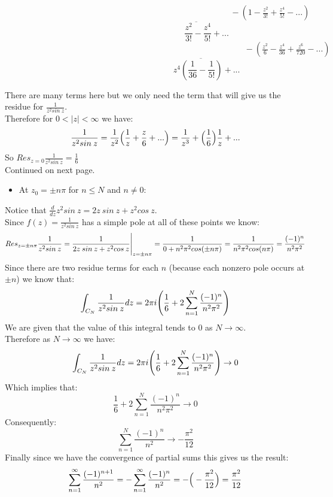 \documentclass{article}
\begin{document}
$\;\;\;\;\;\;\;\;\;\;\;\;\;\;\;\;\;\;\;\;\;\;\;\;\;\;\;\;\;\;\;\;\;\;\;\;\;\;\;\;\;\;\;\;\;\;\;\;\;\;\;\;\;\;\;\;\;\;\;\;\;\;\;\;\;\;\;\;\;\;\;\;\;\;\;\;\;\;\;\;\;\;\;\;\;\;\;\;\;\;\;\;\;\;\;\;\; -(1 -\frac{z^2}{3!} +\frac{z^4}{5!} -...)$
\[\;\;\;\;\;\;\;\;\;\;\;\;\;\;\;\;\;\;\;\;\;\;\;\;\;\;\;\;\;\;\;\;\;\;\;\overline{\;\;\;\;\;\;\;\;\;\frac{z^2}{3!} -\frac{z^4}{5!} + ...}\]
$\;\;\;\;\;\;\;\;\;\;\;\;\;\;\;\;\;\;\;\;\;\;\;\;\;\;\;\;\;\;\;\;\;\;\;\;\;\;\;\;\;\;\;\;\;\;\;\;\;\;\;\;\;\;\;\;\;\;\;\;\;\;\;\;\;\;\;\;\;\;\;\;\;\;\;\;\;\;\;\;\;\;\;\;\;\;\;\;\;\;\;\;\;\;\;\;\;\;\;\;\;\;\; -(\frac{z^2}{6} -\frac{z^4}{36} +\frac{z^6}{720} -...)$
\[\;\;\;\;\;\;\;\;\;\;\;\;\;\;\;\;\;\;\;\;\;\;\;\;\;\;\;\;\;\;\;\;\;\;\;\;\;\;\;\overline{\;\;\;\;\; z^4 (\frac{1}{36} -\frac{1}{5!}) + ...}\]
\begin{center}
    \doublespacing
    There are many terms here but we only need the term that will give us the residue for $\frac{1}{z^2 sin\:z}$.
    \\Therefore for $0 < |z| <\infty$ we have:
    \[\frac{1}{z^2 sin\:z} =\frac{1}{z^2}\Big{(}\frac{1}{z} +\frac{z}{6} + ...\Big{)} =\frac{1}{z^3} +\Big{(}\frac{1}{6}\Big{)}\frac{1}{z} + ...\]
    So $Res_{z=0}\frac{1}{z^2 sin\:z} =\frac{1}{6}$
    \break
    \\Continued on next page.
\end{center}
\newpage
\begin{itemize}
    \item At $z_0 =\pm n\pi$ for $n\leq N$ and $n\neq 0$:
\end{itemize}
\begin{center}
    \doublespacing
    Notice that $\frac{d}{dz} z^2 sin\:z = 2z\:sin\:z + z^2 cos\:z$.
    \\Since $f(z) =\frac{1}{z^2 sin\:z}$ has a simple pole at all of these points we know:
    \[Res_{z=\pm n\pi}\frac{1}{z^2 sin\:z} =\frac{1}{2z\:sin\:z + z^2 cos\:z}\Bigg{|}_{z=\pm n\pi} =\frac{1}{0 + n^2\pi ^2 cos(\pm n\pi)} =\frac{1}{n^2\pi ^2 cos(n\pi)} =\frac{(-1)^n}{n^2\pi ^2}\]
    \break
    Since there are two residue terms for each $n$ (because each nonzero pole occurs at $\pm n$) we know that:
    \[\int _{C_N}\frac{1}{z^2 sin\:z} dz = 2\pi i\Bigg{(}\frac{1}{6} + 2\sum_{n=1}^N\frac{(-1)^n}{n^2\pi ^2}\Bigg{)}\]
    We are given that the value of this integral tends to 0 as $N\rightarrow\infty$.
    \\Therefore as $N\rightarrow\infty$ we have:
    \[\int _{C_N}\frac{1}{z^2 sin\:z} dz = 2\pi i\Bigg{(}\frac{1}{6} + 2\sum_{n=1}^N\frac{(-1)^n}{n^2\pi ^2}\Bigg{)}\rightarrow 0\]
    Which implies that:
    \[\frac{1}{6} + 2\sum_{n=1}^N\frac{(-1)^n}{n^2\pi ^2}\rightarrow 0\]
    Consequently:
    \[\sum_{n=1}^N\frac{(-1)^n}{n^2}\rightarrow -\frac{\pi ^2}{12}\]
    Finally since we have the convergence of partial sums this gives us the result:
    \[\sum_{n=1}^{\infty}\frac{(-1)^{n+1}}{n^2} = -\sum_{n=1}^{\infty}\frac{(-1)^{n}}{n^2} = -\Big{(} -\frac{\pi ^2}{12}\Big{)} =\frac{\pi ^2}{12}\]
    \qedsymbol
\end{center}
\end{document}
